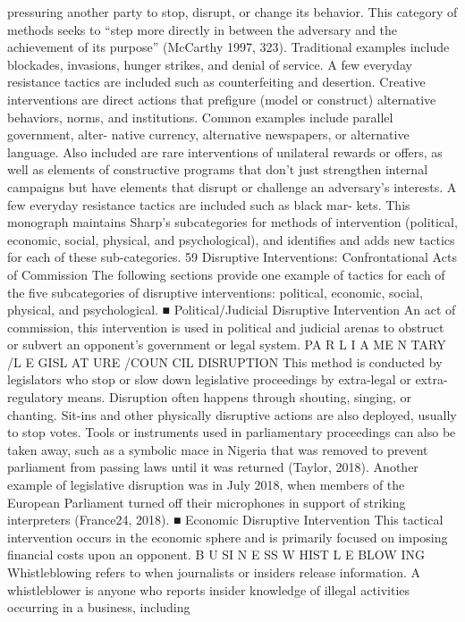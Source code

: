 \documentclass[twoside,a4paper,12pt,fleqn,openany]{extbook}
\begin{document}
pressuring another party to stop, disrupt, or change its behavior. This category of methods
seeks to “step more directly in between the adversary and the achievement of its purpose”
(McCarthy 1997, 323). Traditional examples include blockades, invasions, hunger strikes,
and denial of service. A few everyday resistance tactics are included such as counterfeiting
and desertion.
Creative interventions are direct actions that prefigure (model or construct) alternative
behaviors, norms, and institutions. Common examples include parallel government, alter-
native currency, alternative newspapers, or alternative language. Also included are rare
interventions of unilateral rewards or offers, as well as elements of constructive programs
that don’t just strengthen internal campaigns but have elements that disrupt or challenge
an adversary’s interests. A few everyday resistance tactics are included such as black mar-
kets. This monograph maintains Sharp’s subcategories for methods of intervention (political,
economic, social, physical, and psychological), and identifies and adds new tactics for each
of these sub-categories.
59
Disruptive Interventions: Confrontational Acts of Commission
The following sections provide one example of tactics for each of the five subcategories of
disruptive interventions: political, economic, social, physical, and psychological.
■ Political/Judicial Disruptive Intervention
An act of commission, this intervention is used in political and judicial arenas to obstruct or
subvert an opponent’s government or legal system.
PA R L I A ME N TARY /L E GISL AT URE /COUN CIL DISRUPTION
This method is conducted by legislators who stop or slow down legislative proceedings by
extra-legal or extra-regulatory means. Disruption often happens through shouting, singing,
or chanting. Sit-ins and other physically disruptive actions are also deployed, usually to stop
votes. Tools or instruments used in parliamentary proceedings can also be taken away, such
as a symbolic mace in Nigeria that was removed to prevent parliament from passing laws
until it was returned (Taylor, 2018). Another example of legislative disruption was in July 2018,
when members of the European Parliament turned off their microphones in support of striking
interpreters (France24, 2018).
■ Economic Disruptive Intervention
This tactical intervention occurs in the economic sphere and is primarily focused on imposing
financial costs upon an opponent.
B U SI N E SS W HIST L E BLOW ING
Whistleblowing refers to when journalists or insiders release information. A whistleblower is
anyone who reports insider knowledge of illegal activities occurring in a business, including
\end{document}
